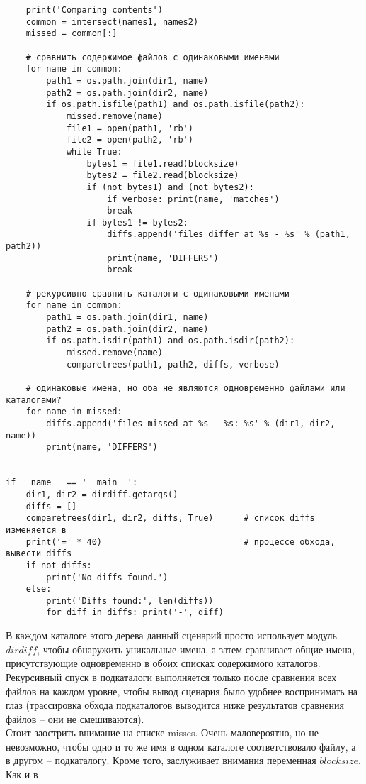 \documentclass[12pt]{article}
\begin{document}
\begin{verbatim}
    print('Comparing contents')
    common = intersect(names1, names2)
    missed = common[:]

    # сравнить содержимое файлов с одинаковыми именами
    for name in common:
        path1 = os.path.join(dir1, name)
        path2 = os.path.join(dir2, name)
        if os.path.isfile(path1) and os.path.isfile(path2):
            missed.remove(name)
            file1 = open(path1, 'rb')
            file2 = open(path2, 'rb')
            while True:
                bytes1 = file1.read(blocksize)
                bytes2 = file2.read(blocksize)
                if (not bytes1) and (not bytes2):
                    if verbose: print(name, 'matches')
                    break
                if bytes1 != bytes2:
                    diffs.append('files differ at %s - %s' % (path1, path2))
                    print(name, 'DIFFERS')
                    break

    # рекурсивно сравнить каталоги с одинаковыми именами
    for name in common:
        path1 = os.path.join(dir1, name)
        path2 = os.path.join(dir2, name)
        if os.path.isdir(path1) and os.path.isdir(path2):
            missed.remove(name)
            comparetrees(path1, path2, diffs, verbose)

    # одинаковые имена, но оба не являются одновременно файлами или каталогами?
    for name in missed:
        diffs.append('files missed at %s - %s: %s' % (dir1, dir2, name))
        print(name, 'DIFFERS')


if __name__ == '__main__':
    dir1, dir2 = dirdiff.getargs()
    diffs = []
    comparetrees(dir1, dir2, diffs, True)      # список diffs изменяется в
    print('=' * 40)                            # процессе обхода, вывести diffs
    if not diffs:
        print('No diffs found.')
    else:
        print('Diffs found:', len(diffs))
        for diff in diffs: print('-', diff)
\end{verbatim}
В каждом каталоге этого дерева данный сценарий просто использует
модуль $dirdiff$, чтобы обнаружить уникальные имена, а затем сравнивает общие имена, присутствующие одновременно в обоих списках содержимого каталогов. Рекурсивный спуск в подкаталоги выполняется
только после сравнения всех файлов на каждом уровне, чтобы вывод
сценария было удобнее воспринимать на глаз (трассировка обхода подкаталогов выводится ниже результатов сравнения файлов – они не смешиваются).\\
Стоит заострить внимание на списке misses. Очень маловероятно, но не невозможно, чтобы одно и то
же имя в одном каталоге соответствовало файлу, а в другом – подкаталогу. Кроме того, заслуживает внимания переменная $blocksize$. Как и в
\end{document}
